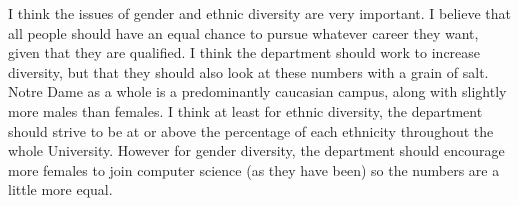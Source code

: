 \documentclass{article}
\begin{document}
I think the issues of gender and ethnic diversity are very important. I
believe that all people should have an equal chance to pursue whatever 
career they want, given that they are qualified. I think the department
should work to increase diversity, but that they should also look at these 
numbers with a grain of salt. Notre Dame as a whole is a predominantly 
caucasian campus, along with slightly more males than females. I think at
least for ethnic diversity, the department should strive to be at or above
the percentage of each ethnicity throughout the whole University. However
for gender diversity, the department should encourage more females to join 
computer science (as they have been) so the numbers are a little more equal.
\\
\end{document}
